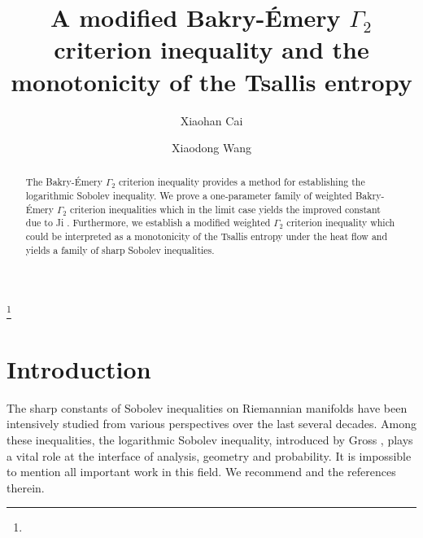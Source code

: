 \documentclass[11pt]{amsart}
\numberwithin{equation}{section}
\numberwithin{lemma}{section}
\numberwithin{proposition}{section}
\numberwithin{corollary}{section}
\numberwithin{remark}{section}
\begin{document}
\title[Modified Bakry-\'Emery $\Gamma_2$ criterion and Tsallis entropy]{A modified Bakry-\'Emery $\Gamma_2$ criterion inequality and the monotonicity of the Tsallis entropy}
\author{Xiaohan Cai}
\address{School of Mathematical Sciences, Shanghai Jiao Tong University, Shanghai 200240, China}
\author{Xiaodong Wang}
\address{Department of Mathematics,
Michigan State University, East Lansing, MI 48824}

\thanks{}
\date{}
\begin{abstract}
The Bakry-\'Emery $\Gamma_2$ criterion inequality provides a method for establishing the logarithmic Sobolev inequality. We prove a one-parameter family of weighted Bakry-\'Emery $\Gamma_2$ criterion inequalities which in the limit case yields the improved constant due to Ji \cite{Ji24}.  Furthermore, we establish a modified weighted $\Gamma_2$ criterion inequality which could be interpreted as a monotonicity of the Tsallis entropy under the heat flow and yields a family of sharp Sobolev inequalities.






\end{abstract}
\maketitle
\section{Introduction}
	The sharp constants of Sobolev inequalities on Riemannian manifolds have been intensively studied from various perspectives over the last several decades.
    Among these inequalities, the logarithmic Sobolev inequality, introduced by Gross \cite{Gro75}, plays a vital role at the interface of analysis, geometry and probability. It is impossible to mention all important work in this field. We recommend \cite{Rot81,Bec99,BL00,Per02,Led06,Bak06,BE06,Gro06, Bre22} and the references therein.
\end{document}
